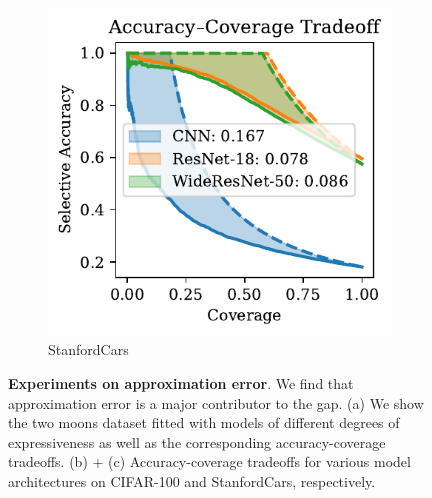 \begin{figure}[t]
\begin{subfigure}[t]{0.24\textwidth}
    \includegraphics[width=\linewidth]{figs/sc_bounds/stanfordcars_arch_tradeoffs.pdf}
    \caption{StanfordCars}
    \label{fig:right}
  \end{subfigure}
  \caption[Experiments on approximation error.]{\textbf{Experiments on approximation error}. We find that approximation error is a major contributor to the gap. (a) We show the two moons dataset fitted with models of different degrees of expressiveness as well as the corresponding accuracy-coverage tradeoffs. (b) + (c) Accuracy-coverage tradeoffs for various model architectures on CIFAR-100 and StanfordCars, respectively.}
  \label{fig:exp_appr}
\end{figure}

